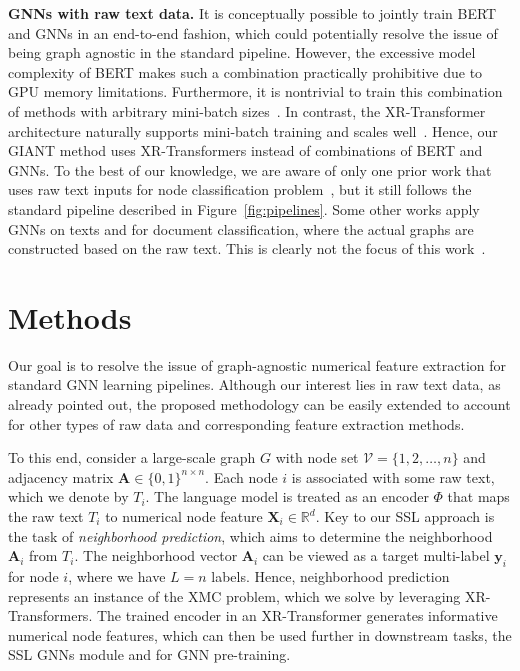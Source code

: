 \documentclass{article} %
\begin{document}
\textbf{GNNs with raw text data. }
It is conceptually possible to jointly train BERT and GNNs in an end-to-end fashion, which could potentially resolve the issue of being graph agnostic in the standard pipeline. However, the excessive model complexity of BERT makes such a combination practically prohibitive due to GPU memory limitations. Furthermore, it is nontrivial to train this combination of methods with arbitrary mini-batch sizes~\citep{chiang2019cluster,graphsaint-iclr20}. In contrast, the XR-Transformer architecture naturally supports mini-batch training and scales well~\citep{jiang2021lightxml}. Hence, our GIANT method uses XR-Transformers instead of combinations of BERT and GNNs. To the best of our knowledge, we are aware of only one prior work that uses raw text inputs for node classification problem~\citep{zhang2020graph}, but it still follows the standard pipeline described in Figure~\ref{fig:pipelines}. Some other works apply GNNs on texts and for document classification, where the actual graphs are constructed based on the raw text. This is clearly not the focus of this work~\citep{yao2019graph,huang2019text,zhang2020text,liu2020tensor}.

\vspace{-0.3cm}
\section{Methods}\label{sec:method}
Our goal is to resolve the issue of graph-agnostic numerical feature extraction for standard GNN learning pipelines. Although our interest lies in raw text data, as already pointed out, the proposed methodology can be easily extended to account for other types of raw data and corresponding feature extraction methods. 

To this end, consider a large-scale graph $G$ with node set $\mathcal{V}=\{1,2,\ldots,n\}$ and adjacency matrix $\mathbf{A}\in \{0,1\}^{n\times n}$. Each node $i$ is associated with some raw text, which we denote by $T_i$. The language model is treated as an encoder $\Phi$ that maps the raw text $T_i$ to numerical node feature $\mathbf{X}_i\in \mathbb{R}^d$. Key to our SSL approach is the task of \emph{neighborhood prediction}, which aims to determine the neighborhood $\mathbf{A}_i$ from $T_i$. The neighborhood vector $\mathbf{A}_i$ can be viewed as a target multi-label $\mathbf{y}_i$ for node $i$, where we have $L=n$ labels. Hence, neighborhood prediction represents an instance of the XMC problem, which we solve by leveraging XR-Transformers. The trained encoder in an XR-Transformer generates informative numerical node features, which can then be used further in downstream tasks, the SSL GNNs module and for GNN pre-training. 
\end{document}
